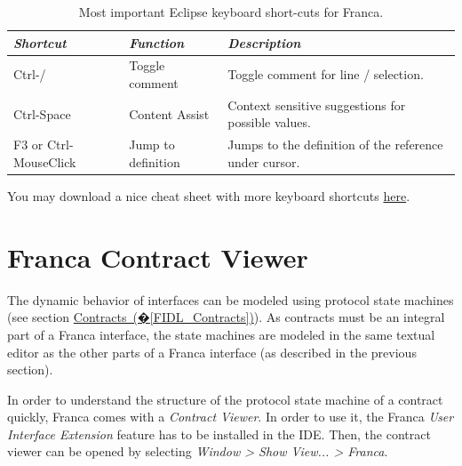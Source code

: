 \documentclass[a4paper,10pt]{scrreprt}
\newlength{\XdocTEffectiveWidth}
\begin{document}
\begin{table}
\setlength{\XdocTEffectiveWidth}{\textwidth}
\addtolength{\XdocTEffectiveWidth}{-6.0\tabcolsep}
\noindent\begin{tabular}{p{0.25\XdocTEffectiveWidth}p{0.25\XdocTEffectiveWidth}p{0.50\XdocTEffectiveWidth}}
\toprule
\textit{Shortcut}

 & \textit{Function}

 & \textit{Description}

\\
\midrule
Ctrl-/

 & Toggle comment

 & Toggle comment for line / selection.

\\
Ctrl-Space

 & Content Assist

 & Context sensitive suggestions for possible values.

\\
F3 or Ctrl-MouseClick

 & Jump to definition

 & Jumps to the definition of the reference under cursor.

\\
\bottomrule
\end{tabular}
\caption{Most important Eclipse keyboard short-cuts for Franca.}
\label{KeyboardShortcuts}
\end{table}

You may download a nice cheat sheet with more keyboard shortcuts
\href{http://5ise.quanxinquanyi.de/2012/01/13/xtext-end-user-domain-experts-cheat-sheet/}{here}.


\section{Franca Contract Viewer}
\label{FrancaTooling_ContractViewer}
The dynamic behavior of interfaces can be modeled using protocol state machines
(see section \hyperref[FIDL_Contracts]{Contracts~(�\ref*{FIDL_Contracts})}). As contracts must be an integral part
of a Franca interface, the state machines are modeled in the same textual editor
as the other parts of a Franca interface (as described in the previous section).

In order to understand the structure of the protocol state machine of a contract
quickly, Franca comes with a \textit{Contract Viewer}. In order to use it,
the Franca \textit{User Interface Extension} feature has to be installed in the IDE.
Then, the contract viewer can be opened by selecting \textit{Window > Show View... > Franca}. 
\end{document}
